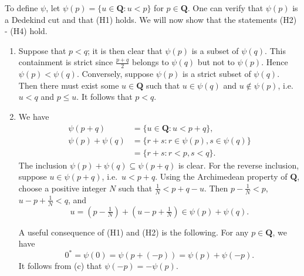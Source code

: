 \documentclass[12pt]{article}
\newcommand{\newp}{\vspace{5mm}}
\newcommand{\Q}{\mathbf{Q}}
\theoremstyle{definition}
\begin{document}
\newp

To define \( \psi \), let \( \psi(p) = \{ u \in \Q : u < p \} \) for \( p \in \Q \). One can verify that \( \psi(p) \) is a Dedekind cut and that (H1) holds. We will now show that the statements (H2) - (H4) hold.

\begin{enumerate}[label = (H\arabic*), start = 2]
    \item Suppose that \( p < q \); it is then clear that \( \psi(p) \) is a subset of \( \psi(q) \). This containment is strict since \( \tfrac{p + q}{2} \) belongs to \( \psi(q) \) but not to \( \psi(p) \). Hence \( \psi(p) < \psi(q) \). Conversely, suppose \( \psi(p) \) is a strict subset of \( \psi(q) \). Then there must exist some \( u \in \Q \) such that \( u \in \psi(q) \) and \( u \not\in \psi(p) \), i.e.\ \( u < q \) and \( p \leq u \). It follows that \( p < q \).

    \item We have
    \begin{align*}
        \psi(p + q) &= \{ u \in \Q : u < p + q \}, \\
        \psi(p) + \psi(q) &= \{ r + s : r \in \psi(p), s \in \psi(q) \} \\
        &= \{ r + s : r < p, s < q \}.
    \end{align*}
    The inclusion \( \psi(p) + \psi(q) \subseteq \psi(p + q) \) is clear. For the reverse inclusion, suppose \( u \in \psi(p + q) \), i.e.\ \( u < p + q \). Using the Archimedean property of \( \Q \), choose a positive integer \( N \) such that \( \tfrac{1}{N} < p + q - u \). Then \( p - \tfrac{1}{N} < p \), \( u - p + \tfrac{1}{N} < q \), and
    \[
        u = \left(p - \tfrac{1}{N}\right) + \left(u - p + \tfrac{1}{N}\right) \in \psi(p) + \psi(q).
    \]

    A useful consequence of (H1) and (H2) is the following. For any \( p \in \Q \), we have
    \[
        0^* = \psi(0) = \psi(p + (-p)) = \psi(p) + \psi(-p).
    \]
    It follows from  (c) that \( \psi(-p) = -\psi(p) \).


\end{enumerate}
\end{document}
